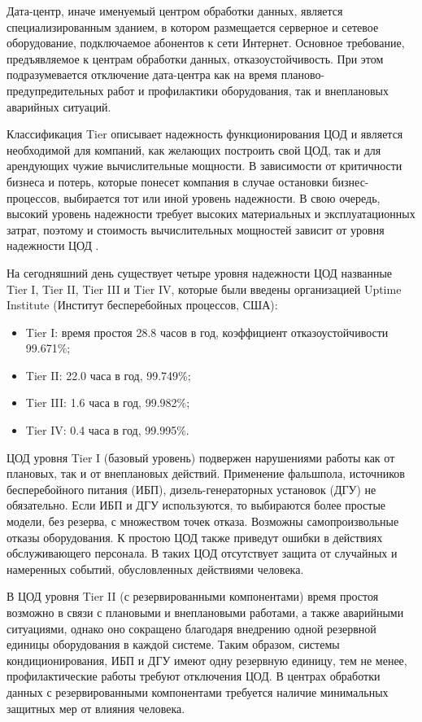 Дата-центр, иначе именуемый центром обработки данных, является специализированным зданием, в котором размещается серверное и сетевое оборудование, подключаемое абонентов к сети Интернет.
Основное требование, предъявляемое к центрам обработки данных, отказоустойчивость.
При этом подразумевается отключение дата-центра как на время планово-предупредительных работ и профилактики оборудования, так и внеплановых аварийных ситуаций.

Классификация Tier описывает надежность функционирования ЦОД и является необходимой для компаний, как желающих построить свой ЦОД, так и для арендующих чужие вычислительные мощности.
В зависимости от критичности бизнеса и потерь, которые понесет компания в случае остановки бизнес-процессов, выбирается тот или иной уровень надежности.
В свою очередь, высокий уровень надежности требует высоких материальных и эксплуатационных затрат, поэтому и стоимость вычислительных мощностей зависит от уровня надежности ЦОД \cite{dc-tier}.

На сегодняшний день существует четыре уровня надежности ЦОД названные Tier I, Tier II, Tier III и Tier IV, которые были введены организацией Uptime Institute (Институт бесперебойных процессов, США):
\begin{itemize}
  \item Tier I: время простоя 28.8 часов в год, коэффициент отказоустойчивости 99.671\%;
  \item Tier II: 22.0 часа в год, 99.749\%;
  \item Tier III: 1.6 часа в год, 99.982\%;
  \item Tier IV: 0.4 часа в год, 99.995\%.
\end{itemize}

ЦОД уровня Tier I (базовый уровень) подвержен нарушениями работы как от плановых, так и от внеплановых действий.
Применение фальшпола, источников бесперебойного питания (ИБП), дизель-генераторных установок (ДГУ) не обязательно.
Если ИБП и ДГУ используются, то выбираются более простые модели, без резерва, с множеством точек отказа.
Возможны самопроизвольные отказы оборудования.
К простою ЦОД также приведут ошибки в действиях обслуживающего персонала.
В таких ЦОД отсутствует защита от случайных и намеренных событий, обусловленных действиями человека.

В ЦОД уровня Tier II (с резервированными компонентами) время простоя возможно в связи с плановыми и внеплановыми работами, а также аварийными ситуациями, однако оно сокращено благодаря внедрению одной резервной единицы оборудования в каждой системе.
Таким образом, системы кондиционирования, ИБП и ДГУ имеют одну резервную единицу, тем не менее, профилактические работы требуют отключения ЦОД.
В центрах обработки данных с резервированными компонентами требуется наличие минимальных защитных мер от влияния человека.


